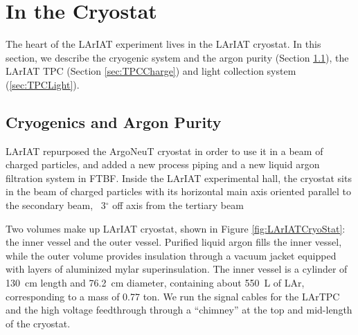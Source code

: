 \section{In the Cryostat}
The heart of the LArIAT experiment lives in the LArIAT cryostat. In this section, we describe the cryogenic system and the argon purity (Section \ref{ch:Cryo}), the LArIAT TPC (Section \ref{sec:TPCCharge}) and light collection system (\ref{sec:TPCLight}).
\subsection{Cryogenics and Argon Purity}\label{ch:Cryo}
LArIAT repurposed the ArgoNeuT cryostat \cite{ArgoNeuT-det} in order to use it in a beam of charged particles, and added a new process piping and a new liquid argon filtration system in FTBF.  %
Inside the LArIAT experimental hall, the cryostat sits in the beam of charged particles with its horizontal main axis oriented parallel to the secondary beam, ~3$^\circ$ off axis from the tertiary beam

Two volumes make up LArIAT cryostat, shown in Figure \ref{fig:LArIATCryoStat}:  the inner vessel and the outer vessel. Purified liquid argon fills the inner vessel, while the outer volume provides insulation through a vacuum jacket equipped with layers of aluminized mylar superinsulation. The inner vessel is a cylinder of 130~cm length and 76.2~cm diameter, containing about 550~L of LAr, corresponding to a mass of 0.77 ton. We run the signal cables for the LArTPC and the high voltage feedthrough through a ``chimney'' at the top and mid-length of the cryostat.


